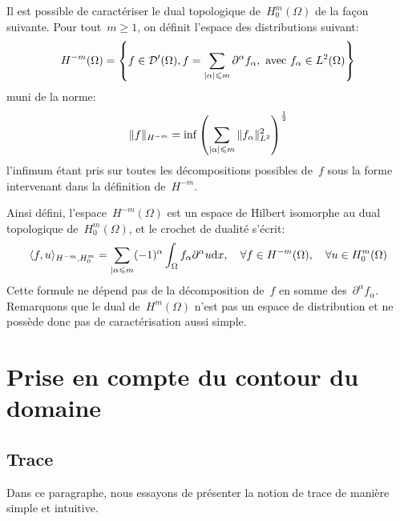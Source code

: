 \medskip
\begin{definition}\label{Th-Hmm}
Il est possible de caractériser le dual topologique de~$H^m_0(\Omega)$ de la façon suivante. Pour tout~$m\ge 1$, on définit l'espace des distributions suivant:
\begin{equation}
H^{-m}(\Omega) =\left\{
f\in \mathcal{D}'(\Omega), f=\displaystyle\sum_{|\alpha|\leqslant m} \partial^\alpha f_\alpha,
\text{ avec } f_\alpha\in L^2(\Omega)
\right\}
\end{equation}
muni de la norme:
\begin{equation}
\|f\|_{H^{-m}} = \inf \left( \displaystyle\sum_{|\alpha|\leqslant m} \|f_\alpha\|^2_{L^2} \right)^{1\over2}
\end{equation}
l'infimum étant pris sur toutes les décompositions possibles de~$f$ sous la forme intervenant dans la définition de~$H^{-m}$.
\end{definition}
\medskipvm
Ainsi défini, l'espace~$H^{-m}(\Omega)$ est un espace de Hilbert isomorphe au dual topologique de~$H^m_0(\Omega)$, et le crochet de dualité s'écrit:
\begin{equation}
\langle f,u\rangle_{H^{-m},H_0^m} = \displaystyle\sum_{|\alpha\leqslant m} (-1)^\alpha \displaystyle\int_\Omega
f_\alpha \partial^\alpha u \text{d} x,
\quad \forall f\in H^{-m}(\Omega),\quad \forall u\in H^m_0(\Omega)
\end{equation}
Cette formule ne dépend pas de la décomposition de~$f$ en somme des~$\partial^\alpha f_\alpha$.
\medskipvm
Remarquons que le dual de~$H^m(\Omega)$ n'est pas un espace de distribution et ne possède donc pas de caractérisation aussi simple.

\medskip
\section{Prise en compte du contour du domaine}

\subsection{Trace}\label{Sec-SoboTrace}
Dans ce paragraphe, nous essayons de présenter la notion de trace de manière simple et intuitive.

